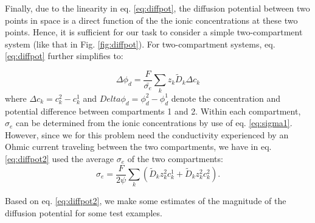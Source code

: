 Finally, due to the linearity in eq. \ref{eq:diffpot}, the diffusion potential between two points in space is a direct function of the the ionic concentrations at these two points. Hence, it is sufficient for our task to consider a simple two-compartment system (like that in Fig. \ref{fig:diffpot}). For two-compartment systems, eq. \ref{eq:diffpot} further simplifies to:

\begin{equation}
\Delta \phi_d = \frac{F}{\bar{\sigma_e}} \sum_k{z_k \tilde{D}_k \Delta c_k}
\label{eq:diffpot2}
\end{equation}
where $\Delta c_k = c_{k}^{2} - c_{k}^{1}$ and $Delta \phi_d = \phi_d^{2} - \phi_d^{1}$ denote the concentration and potential difference between compartments 1 and 2. Within each compartment, $\sigma_e$ can be determined from the ionic concentrations by use of eq. \ref{eq:sigma1}. However, since we for this problem need the conductivity experienced by an Ohmic current traveling between the two compartments, we have in eq. \ref{eq:diffpot2} used the average $\sigma_e$ of the two compartments:
\begin{equation}
\sigma_e = \frac{F}{2\psi}\sum_{k} \left(\tilde{D}_k z_{k}^2 c_{k}^{1} + \tilde{D}_k z_{k}^2 c_{k}^{2} \right).
\label{eq:sigma2}
\end{equation}

Based on eq. \ref{eq:diffpot2}, we make some estimates of the magnitude of the diffusion potential for some test examples.

